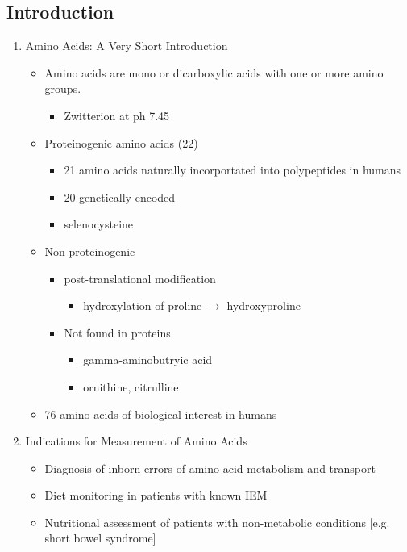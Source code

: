 \documentclass{scrartcl}
\begin{document}
\subsection{Introduction}
\label{sec:org90524f7}
\begin{enumerate}
\item Amino Acids: A Very Short Introduction
\label{sec:org05eb6d7}
\begin{itemize}
\item Amino acids are mono or dicarboxylic acids with one or more amino groups.
\begin{itemize}
\item Zwitterion at ph 7.45
\end{itemize}

\item Proteinogenic amino acids (22)
\begin{itemize}
\item 21 amino acids naturally incorportated into polypeptides in humans
\item 20 genetically encoded
\item selenocysteine
\end{itemize}

\item Non-proteinogenic
\begin{itemize}
\item post-translational modification
\begin{itemize}
\item hydroxylation of proline \(\to\) hydroxyproline
\end{itemize}
\item Not found in proteins
\begin{itemize}
\item gamma-aminobutryic acid
\item ornithine, citrulline
\end{itemize}
\end{itemize}

\item 76 amino acids of biological interest in humans
\end{itemize}

\item Indications for Measurement of Amino Acids
\label{sec:org1b53fbf}
\begin{itemize}
\item Diagnosis of inborn errors of amino acid metabolism and transport
\item Diet monitoring in patients with known IEM
\item Nutritional assessment of patients with non-metabolic conditions [e.g. short bowel syndrome]
\end{itemize}


\end{enumerate}
\end{document}
